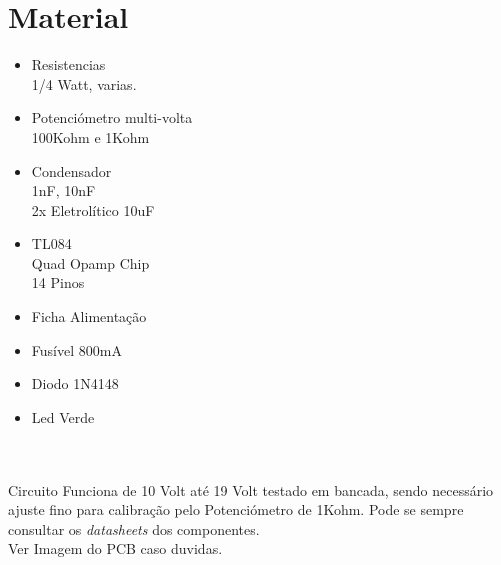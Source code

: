 \documentclass[titlepage, a4paper, 10pt, reqno, openany]{report}
\begin{document}
\section{Material}
\begin{minipage}[t]{.4\linewidth}
	\begin{itemize}
		\setlength\itemsep{-0.5em}
		\item Resistencias \\
		1/4 Watt, varias.
		\item Potenciómetro multi-volta \\
		100Kohm e 1Kohm
		\item Condensador \\
		1nF, 10nF  \\
		2x Eletrolítico 10uF
		
	\end{itemize}
\end{minipage}
\begin{minipage}[t]{.31\linewidth}
	\begin{itemize}
		\setlength\itemsep{-0.5em}
		\item TL084 \\
		Quad Opamp Chip \\
		14 Pinos
		\item Ficha Alimentação
		\item Fusível 800mA
		\item Diodo 1N4148
		\item Led Verde \\
	\end{itemize}
\end{minipage}\\
\\
Circuito Funciona de 10 Volt até 19 Volt testado em bancada, sendo necessário ajuste fino para calibração pelo Potenciómetro de  1Kohm. 
Pode se sempre consultar os {\it datasheets} dos componentes.\\

Ver Imagem do PCB caso duvidas. \\
\end{document}
